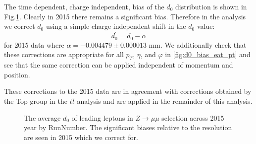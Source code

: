 The time dependent, charge independent, bias of the $d_0$ distribution is shown in Fig.\ref{fig:d0_bias_per_years}. 
Clearly in 2015 
there remains a significant bias.
Therefore in the analysis we correct $d_0$ using a simple charge independent shift in the $d_0$ value:
\begin{equation}
  \label{eq:d0bias}
  d_0^{'} = d_0 - \alpha
\end{equation}
for 2015 data where $\alpha = -0.004479 \pm 0.000013$ mm.
We additionally check that these corrections are appropriate for all $p_T$, $\eta$, and $\varphi$ in \ref{fig:d0_bias_eat_pt} and see that the same correction can be applied independent of momentum and position.

These corrections to the 2015 data 
are in agreement with corrections obtained by the Top group in the $t\bar{t}$ analysis \cite{Mcfayden:2667199} and are applied in the remainder of this analysis.

\begin{figure}[htbp]
\centering
{}
\caption{
  The average $d_0$ of leading leptons in $Z \rightarrow \mu\mu$ selection across 2015 year
  by RunNumber.
  The 
  significant biases relative to the resolution are seen in 2015 
  which we correct for.
}
\label{fig:d0_bias_per_years}
\end{figure}


